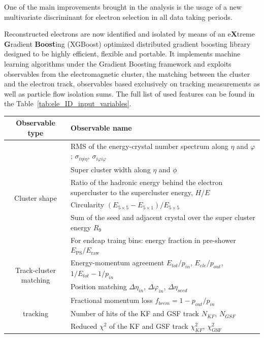 One of the main improvements brought in the analysis is the usage of a new multivariate discriminant for electron selection in all data taking periods.

Reconstructed electrons are now identified and isolated by means of an e\textbf{X}treme \textbf{G}radient \textbf{Boost}ing (XGBoost) optimized distributed
gradient boosting library designed to be highly efficient, flexible and portable. It implements machine learning algorithms under the Gradient Boosting framework
and exploits observables from the electromagnetic cluster, the matching between the cluster and the electron track, observables based exclusively on tracking
measurements as well as particle flow isolation sums. The full list of used features can be found in the Table~\ref{tab:ele_ID_input_variables}.

\begin{table}[H]
\scriptsize
   \centering
   \begin{tabular}{c|l}
\hline
\hline
Observable type & Observable name \\
\hline
\multirow{6}{*}{Cluster shape}
	& RMS of the energy-crystal number spectrum along $\eta$ and $\varphi$; $\sigma_{i\eta i\eta}$, $\sigma_{i\varphi i\varphi}$ \\
	& Super cluster width along $\eta$ and $\phi$ \\
	& Ratio of the hadronic energy behind the electron supercluster to the supercluster energy, $H/E$ \\
	& Circularity $(E_{5\times5} - E_{5\times1})/E_{5\times5}$ \\
	& Sum of the seed and adjacent crystal over the super cluster energy $R_{9}$ \\
	& For endcap traing bins: energy fraction in pre-shower $E_\text{PS}/E_\text{raw}$ \\
\hline
\multirow{2}{*}{Track-cluster matching}
	& Energy-momentum agreement $E_{tot}/p_{in}$, $E_{ele}/p_{out}$, $1/E_{tot} - 1/p_{in}$ \\
	& Position matching $\Delta\eta_{in}$, $\Delta\varphi_{in}$, $\Delta\eta_{seed}$ \\
\hline
\multirow{5}{*}{tracking}
   & Fractional momentum loss $f_{brem} = 1 - p_{out}/p_{in}$ \\
   & Number of hits of the KF and GSF track $N_{KF}$, $N_{GSF}$ \\ %
   & Reduced $\chi^2$ of the KF and GSF track $\chi^{2}_{KF}$, $\chi^{2}_{\textrm{GSF}}$ \\

\end{tabular}
\end{table}
